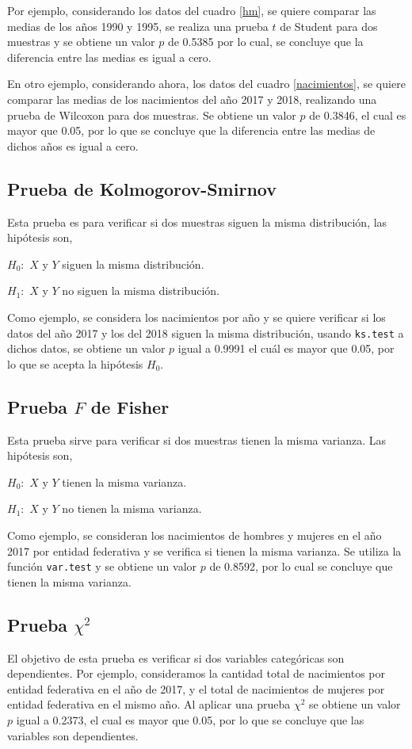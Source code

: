 \documentclass[12pt,letterpaper]{article}
\begin{document}
Por ejemplo, considerando los datos del cuadro \ref{hm}, se quiere comparar las medias de los años 1990 y 1995, se realiza una prueba $t$ de Student para dos muestras y se obtiene un valor $p$ de 0.5385 por lo cual, se concluye que la diferencia entre las medias es igual a cero. 

En otro ejemplo, considerando ahora, los datos del cuadro \ref{nacimientos}, se quiere comparar las medias de los nacimientos del año 2017 y 2018, realizando una prueba de Wilcoxon para dos muestras. Se obtiene un valor $p$ de 0.3846, el cual es mayor que 0.05, por lo que se concluye que la diferencia entre las medias de dichos años es igual a cero.

\subsection{Prueba de Kolmogorov-Smirnov}
Esta prueba es para verificar si dos muestras siguen la misma distribución, las hipótesis son,
\begin{center}
$H_0:$ $X$ y $Y$ siguen la misma distribución.

$H_1:$ $X$ y $Y$ no siguen la misma distribución.
\end{center}
Como ejemplo, se considera los nacimientos por año y se quiere verificar si los datos del año 2017 y los del 2018 siguen la misma distribución, usando \texttt{ks.test} a dichos datos, se obtiene un valor $p$ igual a 0.9991 el cuál es mayor que 0.05, por lo que se acepta la hipótesis $H_0$.

\subsection{Prueba $F$ de Fisher}
Esta prueba sirve para verificar si dos muestras tienen la misma varianza. Las hipótesis son, 
\begin{center}
$H_0:$ $X$ y $Y$ tienen la misma varianza.

$H_1:$ $X$ y $Y$ no tienen la misma varianza.
\end{center}
Como ejemplo, se consideran los nacimientos de hombres y mujeres en el año 2017 por entidad federativa y se verifica si tienen la misma varianza. Se utiliza la función \texttt{var.test} y se obtiene un valor $p$ de 0.8592, por lo cual se concluye que tienen la misma varianza.

\subsection{Prueba $\chi^2$}
El objetivo de esta prueba es verificar si dos variables categóricas son dependientes.
Por ejemplo, consideramos la cantidad total de nacimientos por entidad federativa en el año de 2017, y el total de nacimientos de mujeres por entidad federativa en el mismo año. Al aplicar una prueba $\chi^2$ se obtiene un valor $p$ igual a 0.2373, el cual es mayor que 0.05, por lo que se concluye que las variables son dependientes. 
\end{document}
